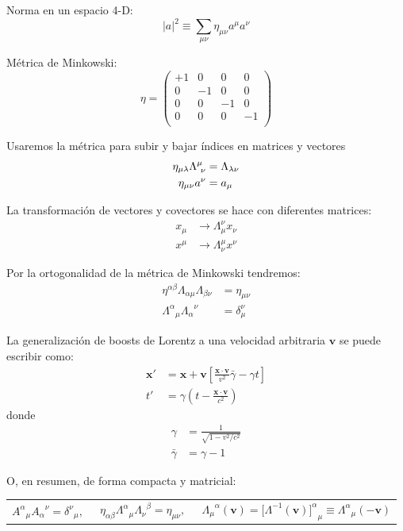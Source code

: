 \documentclass[]{report}
\numberwithin{equation}{section}
\newcommand{\LambdaMuNu}{\indUpDown}
\newcommand{\0}{\textcolor{gray}{0}}
\begin{document}
Norma en un espacio 4-D:
\begin{equation}
	|a|^2 \equiv \sum_{\mu\nu} \eta_{\mu\nu}a^\mu a^\nu
\end{equation}

Métrica de Minkowski:
\begin{equation}
	\eta = \begin{pmatrix}
		+1 &  0 &  0 &  0\\
		 0 & -1 &  0 &  0\\
		 0 &  0 & -1 &  0\\
		 0 &  0 &  0 & -1\\
	\end{pmatrix}
\end{equation}

Usaremos la métrica para subir y bajar índices en matrices y vectores
\begin{align}
	\eta_{\mu\lambda}\LambdaMuNu &= \Lambda_{\lambda\nu}\\
	\eta_{\mu\nu}a^\nu &= a_\mu
\end{align}

La transformación de vectores y covectores se hace con diferentes matrices:
\begin{align}
	x_\mu &\rightarrow \Lambda_\mu^\nu x_\nu \\
	x^\mu &\rightarrow \Lambda^\mu_\nu x^\nu
\end{align}

Por la ortogonalidad de la métrica de Minkowski tendremos:
\begin{align}
	\eta^{\alpha\beta} \Lambda_{\alpha\mu} \Lambda_{\beta\nu} &= \eta_{\mu\nu}\\
	{\Lambda^\alpha}_\mu {\Lambda_\alpha}^\nu &= \delta^\nu_\mu
\end{align}

La generalización de boosts de Lorentz a una velocidad arbitraria $\mathbf{v}$ se puede escribir como:
\begin{align}
	\mathbf{x}' &= \mathbf{x} + \mathbf{v}\left[\frac{\mathbf{x} \cdot \mathbf{v}}{v^2} \bar{\gamma} - \gamma t\right] \\
	t' &= \gamma \left(t - \frac{\mathbf{x} \cdot \mathbf{v}}{c^2}\right)
\end{align}
donde
\begin{align}
	\gamma &= \frac{1}{\sqrt{1 - v^2/c^2}}\\
	\bar{\gamma} &= \gamma - 1
\end{align}

O, en resumen, de forma compacta y matricial:
\begin{table}[h!]
	\centering
	\begin{tabular}{ccc}
		${A^\alpha}_\mu {A_\alpha}^\nu = {\delta^\nu}_\mu, \ \ $ & $\eta_{\alpha\beta} {\Lambda^\alpha}_\mu {\Lambda_\nu}^\beta = \eta_{\mu\nu},\ \ $ & ${\Lambda_\mu}^\alpha(\mathbf{v}) = [{\Lambda^{-1}(\mathbf{v})]^\alpha}_\mu \equiv {\Lambda^\alpha}_\mu(-\mathbf{v})$
	\end{tabular}
\end{table}
\end{document}

